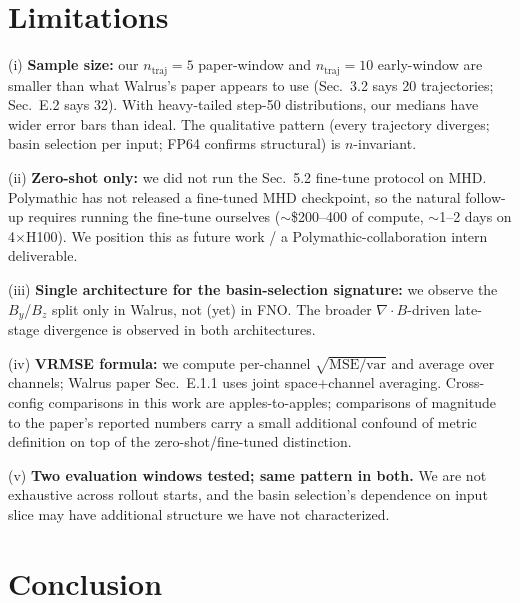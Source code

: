 \documentclass{article}
\begin{document}
\section{Limitations}

(i) \textbf{Sample size:} our $n_{\text{traj}}{=}5$ paper-window and $n_{\text{traj}}{=}10$ early-window are smaller than what Walrus's paper appears to use (Sec.~3.2 says 20 trajectories; Sec.~E.2 says 32). With heavy-tailed step-50 distributions, our medians have wider error bars than ideal. The qualitative pattern (every trajectory diverges; basin selection per input; FP64 confirms structural) is $n$-invariant.

(ii) \textbf{Zero-shot only:} we did not run the Sec.~5.2 fine-tune protocol on MHD. Polymathic has not released a fine-tuned MHD checkpoint, so the natural follow-up requires running the fine-tune ourselves ($\sim$\$200--400 of compute, $\sim$1--2 days on 4$\times$H100). We position this as future work / a Polymathic-collaboration intern deliverable.

(iii) \textbf{Single architecture for the basin-selection signature:} we observe the $B_y$/$B_z$ split only in Walrus, not (yet) in FNO. The broader $\nabla\cdot B$-driven late-stage divergence is observed in both architectures.

(iv) \textbf{VRMSE formula:} we compute per-channel $\sqrt{\text{MSE}/\text{var}}$ and average over channels; Walrus paper Sec.~E.1.1 uses joint space+channel averaging. Cross-config comparisons in this work are apples-to-apples; comparisons of magnitude to the paper's reported numbers carry a small additional confound of metric definition on top of the zero-shot/fine-tuned distinction.

(v) \textbf{Two evaluation windows tested; same pattern in both.} We are not exhaustive across rollout starts, and the basin selection's dependence on input slice may have additional structure we have not characterized.

\section{Conclusion}
\end{document}
